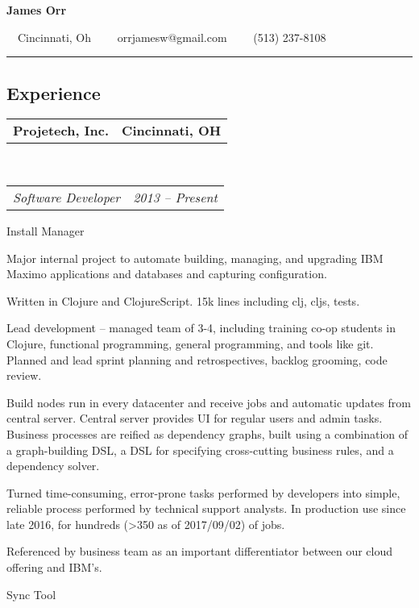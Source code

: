 \documentclass[10pt,letterpaper]{article}
\makeatletter
\newcommand{\headerrow}[2]
{\begin{tabular*}{\linewidth}{l@{\extracolsep{\fill}}r}
	#1 &
	#2 \\
\end{tabular*}}
\makeatother
\begin{document}
\begin{center}
{\LARGE \textbf{James Orr}}

\ \ Cincinnati, Oh\ \ \textbullet
\ \ orrjamesw@gmail.com\ \ \textbullet
\ \ (513) 237-8108
\end{center}

\hrule
\vspace{-0.4em}
\subsection*{Experience}

\headerrow
    {\textbf{Projetech, Inc.}}
    {\textbf{Cincinnati, OH}}
    \\
    \headerrow
	{\emph{Software Developer}}
	{\emph{2013 -- Present}}
	\begin{itemize*}
	\item Install Manager
          \begin{itemize*}
          \item
            Major internal project to automate building, managing, and upgrading IBM Maximo applications and databases and capturing configuration.
          \item Written in Clojure and ClojureScript.  15k lines including clj, cljs, tests.
          \item Lead development -- managed team of 3-4, including training co-op students in Clojure, functional programming, general programming, and tools like git.  Planned and lead sprint planning and retrospectives, backlog grooming, code review.
          \item Build nodes run in every datacenter and receive jobs and automatic updates from central server.  Central server provides UI for regular users and admin tasks.  Business processes are reified as dependency graphs, built using a combination of a graph-building DSL, a DSL for specifying cross-cutting business rules, and a dependency solver.
          \item Turned time-consuming, error-prone tasks performed by developers into simple, reliable process performed by technical support analysts.  In production use since late 2016, for hundreds (>350 as of 2017/09/02) of jobs.
          \item Referenced by business team as an important differentiator between our cloud offering and IBM's.
          \end{itemize*}

	\item Sync Tool


\end{itemize*}
\end{document}
